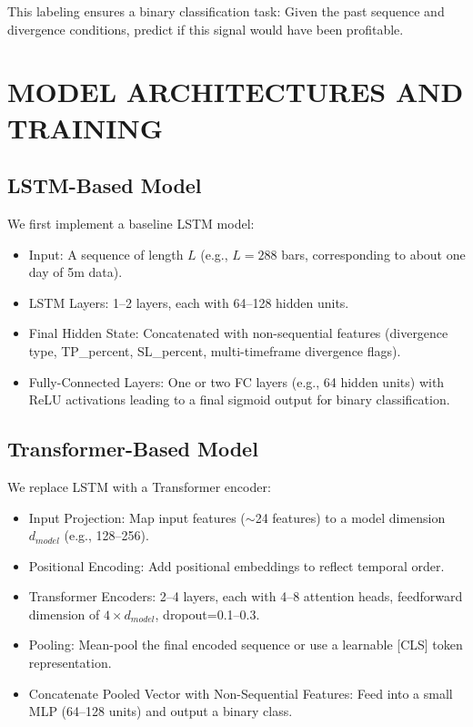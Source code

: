 \documentclass[letterpaper, 10 pt, conference]{ieeeconf}  %
\begin{document}
This labeling ensures a binary classification task: Given the past sequence and divergence conditions, predict if this signal would have been profitable.

\section{MODEL ARCHITECTURES AND TRAINING}

\subsection{LSTM-Based Model}
We first implement a baseline LSTM model:
\begin{itemize}
    \item Input: A sequence of length $L$ (e.g., $L=288$ bars, corresponding to about one day of 5m data).
    \item LSTM Layers: 1--2 layers, each with 64--128 hidden units.
    \item Final Hidden State: Concatenated with non-sequential features (divergence type, TP\_percent, SL\_percent, multi-timeframe divergence flags).
    \item Fully-Connected Layers: One or two FC layers (e.g., 64 hidden units) with ReLU activations leading to a final sigmoid output for binary classification.
\end{itemize}

\subsection{Transformer-Based Model}
We replace LSTM with a Transformer encoder:
\begin{itemize}
    \item Input Projection: Map input features ($\sim$24 features) to a model dimension $d_{model}$ (e.g., 128--256).
    \item Positional Encoding: Add positional embeddings to reflect temporal order.
    \item Transformer Encoders: 2--4 layers, each with 4--8 attention heads, feedforward dimension of $4 \times d_{model}$, dropout=0.1--0.3.
    \item Pooling: Mean-pool the final encoded sequence or use a learnable [CLS] token representation.
    \item Concatenate Pooled Vector with Non-Sequential Features: Feed into a small MLP (64--128 units) and output a binary class.
\end{itemize}
\end{document}
